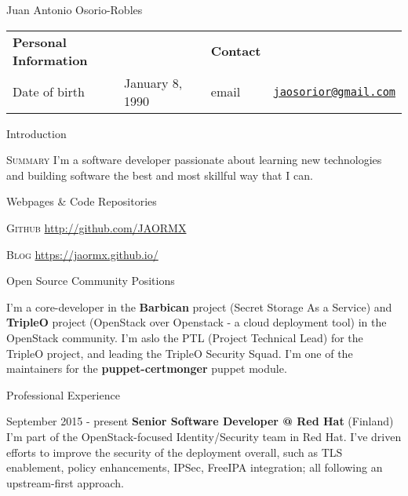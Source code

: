 \documentclass[english,10pt,letterpaper]{article}
\begin{document}
\centering
\begin{cv}{Juan Antonio Osorio-Robles}

	\begin{table}[h]
		\begin{tabular}{@{} l l p{0.5cm} l r}
			{\bf Personal Information}	&	&	&	{\bf Contact}	&\\
			Date of birth &	January 8, 1990	&	&
			email & \href{mailto:jaosorior@gmail.com}{\tt jaosorior@gmail.com}\\
		\end{tabular}
	\end{table}

	\begin{cvlist}{Introduction}
        \item[\textsc{Summary}]
            I'm a software developer passionate about learning new technologies
            and building software the best and most skillful way that I can.
	\end{cvlist}

	\begin{cvlist}{Webpages \& Code Repositories}
        \item [\textsc{Github}]
            \href{http://github.com/JAORMX}{http://github.com/JAORMX}

        \item [\textsc{Blog}]
            \href{https://jaormx.github.io/}{https://jaormx.github.io/}
	\end{cvlist}

    \begin{cvlist}{Open Source Community Positions}
		\item []
            I'm a core-developer in the \textbf{Barbican} project (Secret
            Storage As a Service) and \textbf{TripleO} project (OpenStack
            over Openstack - a cloud deployment tool) in the OpenStack
            community. I'm aslo the PTL (Project Technical Lead) for the
            TripleO project, and leading the TripleO Security Squad. I'm
            one of the maintainers for the \textbf{puppet-certmonger} puppet
            module.
	\end{cvlist}

	\begin{cvlist}{Professional Experience}
		\item [September 2015 - present]
            \textbf{Senior Software Developer @ Red Hat} (Finland)\\
            I'm part of the OpenStack-focused Identity/Security team in Red
            Hat. I've driven efforts to improve the security of the deployment
            overall, such as TLS enablement, policy enhancements, IPSec,
            FreeIPA integration; all following an upstream-first approach.


\end{cvlist}
\end{cv}
\end{document}
